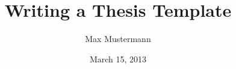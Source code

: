 \newcommand{\thedoctype}{Master's Thesis in Informatik\xspace}
\newcommand{\thetitle}{Writing a Thesis Template\xspace}
\newcommand{\thetitleGer}{Erstellung einer Abschlussarbeitsvorlage\xspace}
\newcommand{\theauthor}{Max Mustermann\xspace}
\newcommand{\theplace}{Munich\xspace}
\newcommand{\thedate}{March 15, 2013\xspace}
\newcommand{\thesupervisor}{Prof. Su Per, Ph.D.}
\newcommand{\theadvisor}{Sau Nett}

\date{\thedate}
\title{\thetitle}
\author{\theauthor}

\newcommand{\footertext}{}
